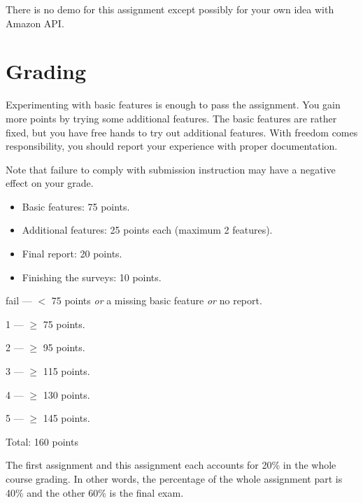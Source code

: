 \documentclass[12pt, a4paper]{article}
\begin{document}
There is no demo for this assignment except possibly for your own idea with Amazon API.

\section{Grading}
Experimenting with basic features is enough to pass the assignment.
You gain more points by trying some additional features.
The basic features are rather fixed, but you have free hands to try out additional features.
With freedom comes responsibility, you should report your experience with proper documentation.

Note that failure to comply with submission instruction may have a negative effect on your grade.

\vskip 20pt

\begin{itemize}
\item Basic features: 75 points.
\item Additional features: 25 points each (maximum 2 features).
\item Final report: 20 points.
\item Finishing the surveys: 10 points.
\end{itemize}

\vskip 10pt

fail --- $<$ 75 points \emph{or} a missing basic feature \emph{or} no report.

1 --- $\ge$ 75 points.

2 --- $\ge$ 95 points.

3 --- $\ge$ 115 points.

4 --- $\ge$ 130 points.

5 --- $\ge$ 145 points.

\vskip 20pt

Total: 160 points

\vskip 20pt

The first assignment and this assignment each accounts for 20\% in the whole course grading.
In other words, the percentage of the whole assignment part is 40\% and the other 60\% is the final exam.
\end{document}
